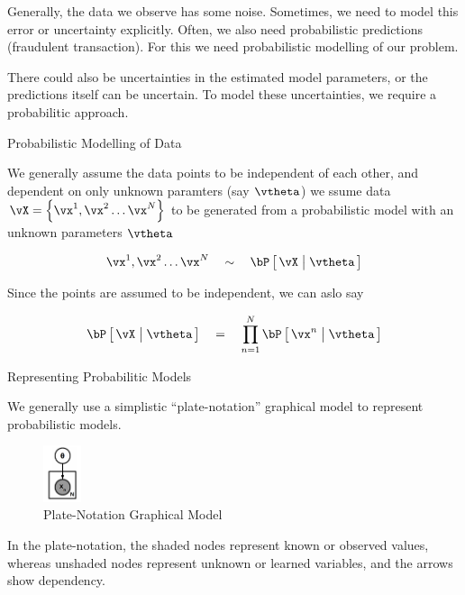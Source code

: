 \documentclass{article}
\begin{document}
\makeheader

Generally, the data we observe has some noise. Sometimes, we need to model this error or uncertainty explicitly. Often, we also need probabilistic predictions (fraudulent transaction). For this we need probabilistic modelling of our problem. \br

There could also be uncertainties in the estimated model parameters, or the predictions itself can be uncertain. To model these uncertainties, we require a probabilitic approach.

\begin{ssection}{Probabilistic Modelling of Data}

	We generally assume the data points to be independent of each other, and dependent on only unknown paramters (say $\vtheta$)  we ssume data $\vX = \set{\vx^1, \vx^2 \dots \vx^N}$ to be generated from a probabilistic model with an unknown parameters $\vtheta$

	\begin{align*}
		\vx^1, \vx^2 \dots \vx^N	\qsim	\prob{\vX \pipe \vtheta}
	\end{align*}

	Since the points are assumed to be independent, we can aslo say

	\begin{align*}
		\prob{\vX \pipe \vtheta}	\eq	\prod_{n = 1}^N \prob{\vx^n \pipe \vtheta}
	\end{align*}

	\begin{ssubsection}{Representing Probabilitic Models}

		We generally use a simplistic ``plate-notation'' graphical model to represent probabilistic models.

		\begin{figure}[h!]
			\centering
			\includegraphics[width=0.1\textwidth]{includes/s01/plate-graphical-model.png}
			\caption{Plate-Notation Graphical Model}
			\label{fig:plate-model}
		\end{figure}

		In the plate-notation, the shaded nodes represent known or observed values, whereas unshaded nodes represent unknown or learned variables, and the arrows show dependency. \br


\end{ssubsection}
\end{ssection}
\end{document}
